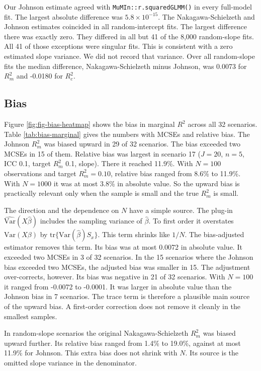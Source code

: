 \documentclass[
  11pt,
]{article}
\begin{document}
Our Johnson estimate agreed with \texttt{MuMIn::r.squaredGLMM()} in every
full-model fit. The largest absolute difference was
\(5.8 \times 10^{-15}\). The Nakagawa-Schielzeth and Johnson
estimates coincided in all random-intercept fits. The largest
difference there was
exactly zero. They differed in all but 41 of the
8,000 random-slope fits. All
41 of those exceptions were singular fits. This
is consistent with a zero estimated slope variance. We did not
record that variance. Over all
random-slope fits the median difference,
Nakagawa-Schielzeth minus Johnson, was
0.0073 for \(R^2_m\) and
-0.0180 for \(R^2_c\).

\subsection{Bias}\label{bias}

Figure \ref{fig:fig-bias-heatmap} shows the bias in marginal
\(R^2\) across all 32 scenarios. Table \ref{tab:bias-marginal} gives
the numbers with MCSEs and relative bias. The Johnson \(R^2_m\) was
biased upward in 29 of 32 scenarios. The bias exceeded two
MCSEs in 15 of them. Relative bias was largest in scenario
17 (\(J = 20\),
\(n = 5\), ICC 0.1, target
\(R^2_m\) 0.1, slope). There
it reached 11.9\%. With \(N = 100\)
observations and target \(R^2_m = 0.10\), relative bias ranged from
8.6\% to 11.9\%. With
\(N = 1000\) it was at most 3.8\% in absolute value.
So the upward bias is practically relevant only when the sample
is small and the true \(R^2_m\) is small.

The direction and the dependence on \(N\) have a simple source. The
plug-in \(\widehat{\text{Var}}(X\hat\beta)\) includes the sampling
variance of \(\hat\beta\). To first order it overstates
\(\text{Var}(X\beta)\) by \(\text{tr}\{\text{Var}(\hat\beta) S_x\}\).
This term shrinks like \(1/N\). The bias-adjusted estimator removes
this term. Its bias was at most 0.0072
in absolute value. It exceeded two MCSEs in 3 of 32
scenarios. In the 15 scenarios where the Johnson bias
exceeded two MCSEs, the adjusted bias was smaller in
15. The adjustment over-corrects, however. Its bias
was negative in 21 of 32 scenarios. With \(N = 100\) it
ranged from -0.0072 to
-0.0001. It was larger in absolute value
than the Johnson bias in 7 scenarios. The trace term is
therefore a plausible main source of the upward bias. A first-order
correction does not remove it cleanly in the smallest samples.

In random-slope scenarios the original Nakagawa-Schielzeth
\(R^2_m\) was biased upward further. Its relative bias ranged from
1.4\% to 19.0\%, against at most
11.9\% for Johnson. This extra bias does not shrink
with \(N\). Its source is the omitted slope variance in the
denominator.
\end{document}
